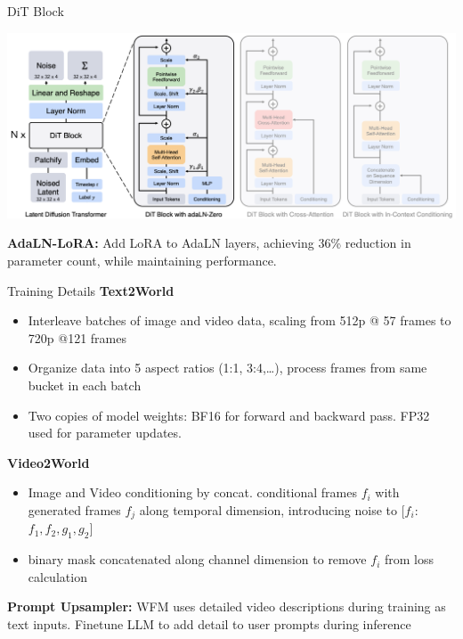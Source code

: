 \documentclass{beamer}
\begin{document}
\begin{frame}{DiT Block}
	\begin{center}
            \includegraphics[width=1.0\textwidth]{./img/diff_arch_final.png}
	\end{center}
    \textbf{AdaLN-LoRA:}\newline
    Add LoRA to AdaLN layers, achieving 36\% reduction in parameter count, while maintaining performance.
\end{frame}

\begin{frame}{Training Details}
    \textbf{Text2World}
    \begin{itemize}[label=-]
        \item Interleave batches of image and video data, scaling from 512p @ 57 frames to 720p @121 frames
        \item Organize data into 5 aspect ratios (1:1, 3:4,\dots), process frames from same bucket in each batch
        \item Two copies of model weights: BF16 for forward and backward pass. FP32 used for parameter updates.
   \end{itemize}
    \textbf{Video2World}
    \begin{itemize}[label=-]
        \item Image and Video conditioning by concat. conditional frames $f_i$ with generated frames $f_j$ along temporal dimension,
        introducing noise to $[f_i$: $f_1, f_2, g_1, g_2]$  
        \item binary mask concatenated along channel dimension to remove $f_i$ from loss calculation
   \end{itemize}
   \textbf{Prompt Upsampler:}\newline
   WFM uses detailed video descriptions during training as text inputs. \newline 
   Finetune LLM to add detail to user prompts during inference
\end{frame}
\end{document}
